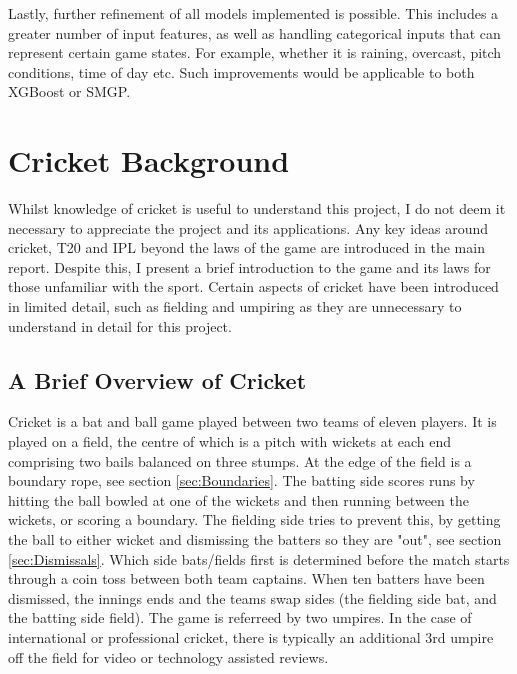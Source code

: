 \documentclass[12pt,a4paper]{report}
\theoremstyle{definition}
\begin{document}
Lastly, further refinement of all models implemented is possible. 
This includes a greater number of input features, as well as handling categorical inputs that can represent certain game states.
For example, whether it is raining, overcast, pitch conditions, time of day etc.
Such improvements would be applicable to both XGBoost or SMGP.




\appendix


\chapter{Cricket Background} \label{chap:CrickBackground}

Whilst knowledge of cricket is useful to understand this project, I do not deem it necessary to appreciate the project and its applications.
Any key ideas around cricket, T20 and IPL beyond the laws of the game are introduced in the main report.
Despite this, I present a brief introduction to the game and its laws for those unfamiliar with the sport.
Certain aspects of cricket have been introduced in limited detail, such as fielding and umpiring as they are unnecessary to understand in detail for this project.

\section{A Brief Overview of Cricket}

Cricket is a bat and ball game played between two teams of eleven players. 
It is played on a field, the centre of which is a pitch with wickets at each end comprising two bails balanced on three stumps. 
At the edge of the field is a boundary rope, see section \ref{sec:Boundaries}. 
The batting side scores runs by hitting the ball bowled at one of the wickets and then running between the wickets, or scoring a boundary.
The fielding side tries to prevent this, by getting the ball to either wicket and dismissing the batters so they are "out", see section \ref{sec:Dismissals}.
Which side bats/fields first is determined before the match starts through a coin toss between both team captains.
When ten batters have been dismissed, the innings ends and the teams swap sides (the fielding side bat, and the batting side field).
The game is referreed by two umpires.
In the case of international or professional cricket, there is typically an additional 3rd umpire off the field for video or technology assisted reviews.
\end{document}
